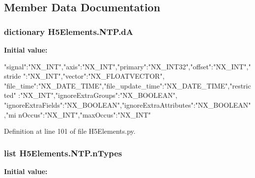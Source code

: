 \subsection{Member Data Documentation}
\hypertarget{classH5Elements_1_1NTP_a7b815d5a20b6b3950e022918a1ca3982}{
\subsubsection[{dA}]{\setlength{\rightskip}{0pt plus 5cm}dictionary H5Elements.NTP.dA}}
\label{classH5Elements_1_1NTP_a7b815d5a20b6b3950e022918a1ca3982}
{\bfseries Initial value:}
\begin{DoxyCode}
{"signal":"NX_INT","axis":"NX_INT","primary":"NX_INT32","offset":"NX_INT","stride
      ":"NX_INT","vector":"NX_FLOATVECTOR",
        "file_time":"NX_DATE_TIME","file_update_time":"NX_DATE_TIME","restricted"
      :"NX_INT","ignoreExtraGroups":"NX_BOOLEAN",
        "ignoreExtraFields":"NX_BOOLEAN","ignoreExtraAttributes":"NX_BOOLEAN","mi
      nOccus":"NX_INT","maxOccus":"NX_INT"
        }
\end{DoxyCode}


Definition at line 101 of file H5Elements.py.\hypertarget{classH5Elements_1_1NTP_a23163fb2be7e3667f630d1568cd556dd}{
\subsubsection[{nTypes}]{\setlength{\rightskip}{0pt plus 5cm}list H5Elements.NTP.nTypes}}
\label{classH5Elements_1_1NTP_a23163fb2be7e3667f630d1568cd556dd}
{\bfseries Initial value:}
\begin{DoxyCode}
\end{DoxyCode}


